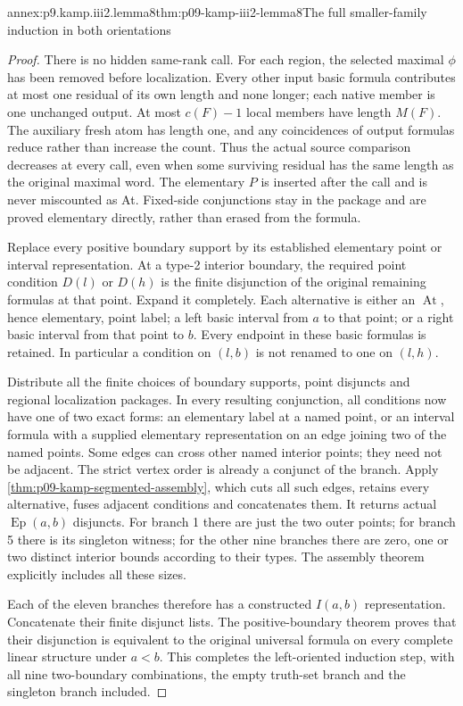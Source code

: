 \begin{annexitem}{annex:p9.kamp.iii2.lemma8}{thm:p09-kamp-iii2-lemma8}{The full smaller-family induction in both orientations}
\begin{proof}
There is no hidden same-rank call. For each region, the selected
maximal \(\phi\) has been removed before localization. Every
other input basic formula contributes at most one residual of its
own length and none longer; each native member is one unchanged
output. At most \(c(F)-1\) local members have length \(M(F)\).
The auxiliary fresh atom has length one, and any coincidences of
output formulas reduce rather than increase the count. Thus the
actual source comparison decreases at every call, even when some
surviving residual has the same length as the original maximal word.
The elementary \(P\) is inserted after the call and is never
miscounted as At. Fixed-side conjunctions stay in the package and
are proved elementary directly, rather than erased from the formula.

Replace every positive boundary support by its established elementary
point or interval representation. At a type-2 interior boundary,
the required point condition \(D(l)\) or \(D(h)\) is
the finite disjunction of the original remaining formulas at that
point. Expand it completely. Each alternative is either an
\(\operatorname{At}\), hence elementary, point label; a
left basic interval from \(a\) to that point; or a right
basic interval from that point to \(b\). Every endpoint in
these basic formulas is retained. In particular a condition on
\((l,b)\) is not renamed to one on \((l,h)\).

Distribute all the finite choices of boundary supports, point
disjuncts and regional localization packages. In every resulting
conjunction, all conditions now have one of two exact forms:
an elementary label at a named point, or an interval formula with
a supplied elementary representation on an edge joining two of
the named points. Some edges can cross other named interior points;
they need not be adjacent. The strict vertex order is already a
conjunct of the branch. Apply
\cref{thm:p09-kamp-segmented-assembly}, which cuts all such edges,
retains every alternative, fuses adjacent conditions and concatenates
them. It returns actual \(\operatorname{Ep}(a,b)\) disjuncts.
For branch 1 there are just the two outer points; for branch 5
there is its singleton witness; for the other nine branches there
are zero, one or two distinct interior bounds according to their
types. The assembly theorem explicitly includes all these sizes.

Each of the eleven branches therefore has a constructed
\(I(a,b)\) representation. Concatenate their finite disjunct
lists. The positive-boundary theorem proves that their disjunction
is equivalent to the original universal formula on every complete
linear structure under \(a<b\). This completes the left-oriented
induction step, with all nine two-boundary combinations, the empty
truth-set branch and the singleton branch included.


\end{proof}
\end{annexitem}
